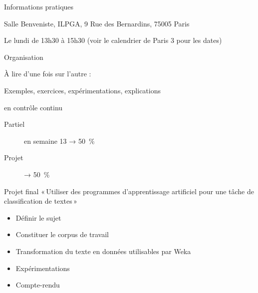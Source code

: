 \documentclass[hyperref={unicode}, xcolor={svgnames}, french]{beamer}
\title{\titlepagetitle}
\author{\textbf{\myname} (\mylab)}
\institute{}
\date{\conference\\\docdate}
\begin{document}

\begin{frame}[plain]
	\titlepage
\end{frame}

\begin{frame}{Informations pratiques}
    \begin{description}[*]
        \item[Où] Salle Benveniste, ILPGA, 9 Rue des Bernardins, 75005 Paris
        \item[Quand] Le lundi de 13h30 à 15h30 (voir le calendrier de Paris 3 pour les dates)
        \item[Contact] 
        \item[Web] {}
    \end{description}
\end{frame}

\begin{frame}{Organisation}
    \begin{description}[*]
        \item[Poly] À lire d'une fois sur l'autre :\\
                    {\footnotesize{}}
        \item[Cours] Exemples, exercices, expérimentations, explications
        \item[Évaluation] en contrôle continu
            \begin{description}
                \item[Partiel] en semaine 13 → \SI{50}{\percent}
                \item[Projet] → \SI{50}{\percent}
            \end{description}
    \end{description}
\end{frame}

\begin{frame}{Projet final}
    « Utiliser des programmes d'apprentissage artificiel pour une tâche de classification de textes »
    \begin{itemize}
        \item Définir le sujet
        \item Constituer le corpus de travail
        \item Transformation du texte en données utilisables par Weka
        \item Expérimentations
        \item Compte-rendu
    \end{itemize}
\end{frame}
\end{document}
